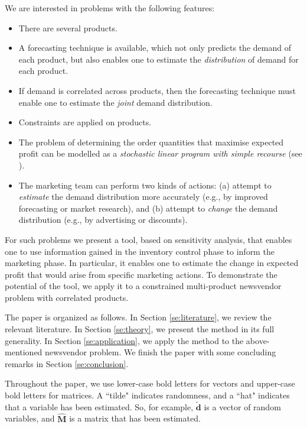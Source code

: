 \documentclass[a4paper,11pt]{article}
\begin{document}
We are interested in problems with the following features:
\begin{itemize}
\item There are several products.
\item A forecasting technique is available, which not only predicts the
demand of each product, but also enables one to estimate the
\emph{distribution} of demand for each product.
\item If demand is correlated across products, then the forecasting
technique must enable one to estimate the \emph{joint} demand
distribution.
\item Constraints are applied on products.
\item The problem of determining the order quantities that maximise
expected profit can be modelled as a \emph{stochastic linear program with
simple recourse} (see \cite{Da55,We84}). 

\item The marketing team can perform two kinds of actions: (a) attempt to
\emph{estimate} the demand distribution more accurately (e.g., by improved
forecasting or market research), and (b) attempt to \emph{change}
the demand distribution (e.g., by advertising or discounts).
\end{itemize}

For such problems we present a tool, based on sensitivity analysis, that
enables one to use information gained in the inventory control phase to
inform the marketing phase. In particular, it enables one to estimate the
change in expected profit that would arise from specific marketing actions.
To demonstrate the potential of the tool, we apply it to a constrained
multi-product newsvendor problem with correlated products.

The paper is organized as follows. In Section \ref{se:literature}, we review
the relevant literature. In Section \ref{se:theory}, we present the method
in its full generality. In Section \ref{se:application}, we apply the method to the above-mentioned newsvendor problem. We finish the paper with some concluding remarks in Section \ref{se:conclusion}.

Throughout the paper, we use lower-case bold letters for vectors and
upper-case bold letters for matrices. A ``tilde" indicates randomness,
and a ``hat" indicates that a variable has been estimated. So, for example,
$\mathbf{\tilde d}$ is a vector of random variables, and
$\hat{\mathbf{M}}$ is a matrix that has been estimated.

\end{document}
